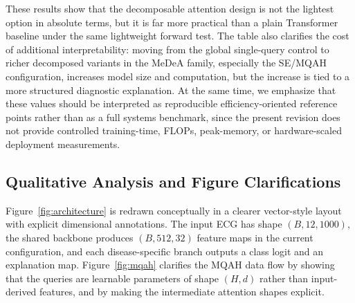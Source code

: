 \documentclass[11pt]{article}
\begin{document}
These results show that the decomposable attention design is not the lightest option in absolute terms, but it is far more practical than a plain Transformer baseline under the same lightweight forward test. The table also clarifies the cost of additional interpretability: moving from the global single-query control to richer decomposed variants in the MeDeA family, especially the SE/MQAH configuration, increases model size and computation, but the increase is tied to a more structured diagnostic explanation. At the same time, we emphasize that these values should be interpreted as reproducible efficiency-oriented reference points rather than as a full systems benchmark, since the present revision does not provide controlled training-time, FLOPs, peak-memory, or hardware-scaled deployment measurements.

\subsection{Qualitative Analysis and Figure Clarifications}

Figure~\ref{fig:architecture} is redrawn conceptually in a clearer vector-style layout with explicit dimensional annotations. The input ECG has shape $(B,12,1000)$, the shared backbone produces $(B,512,32)$ feature maps in the current configuration, and each disease-specific branch outputs a class logit and an explanation map. Figure~\ref{fig:mqah} clarifies the MQAH data flow by showing that the queries are learnable parameters of shape $(H,d)$ rather than input-derived features, and by making the intermediate attention shapes explicit.
\end{document}
